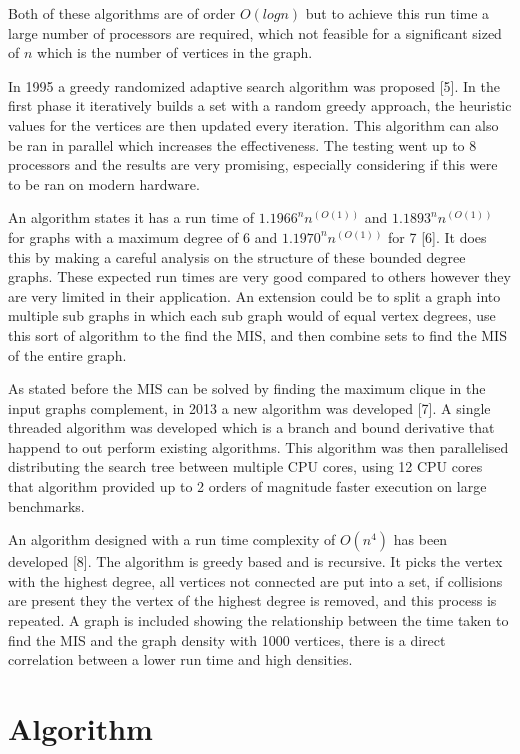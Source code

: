 \documentclass[conference]{IEEEtran}
\begin{document}
Both of these algorithms are of order $O(logn)$ but to achieve this run time a large number of processors are required,
which not feasible for a significant sized of $n$ which is the number of vertices in the graph.

In 1995 a greedy randomized adaptive search algorithm was proposed [5]. In the first phase it iteratively builds a set 
with a random greedy approach, the heuristic values for the vertices are then updated every iteration. This algorithm
can also be ran in parallel which increases the effectiveness. The testing went up to 8 processors and the results are
very promising, especially considering if this were to be ran on modern hardware.

An algorithm states it has a run time of $1.1966^n n^(O(1))$ and $1.1893^n n^(O(1))$ for graphs with a maximum degree
of 6 and $1.1970^n n^(O(1))$ for 7 [6]. It does this by making a careful analysis on the structure of these bounded degree
graphs. These expected run times are very good compared to others however they are very limited in their application.
An extension could be to split a graph into multiple sub graphs in which each sub graph would of equal vertex degrees,
use this sort of algorithm to the find the MIS, and then combine sets to find the MIS of the entire graph.

As stated before the MIS can be solved by finding the maximum clique in the input graphs complement, in 2013 a new 
algorithm was developed [7]. A single threaded algorithm was developed which is a branch and bound derivative that 
happend to out perform existing algorithms. This algorithm was then parallelised distributing the search tree between
multiple CPU cores, using 12 CPU cores that algorithm provided up to 2 orders of magnitude faster execution on large
benchmarks.

An algorithm designed with a run time complexity of $O(n^4)$ has been developed [8]. The algorithm is greedy based and 
is recursive. It picks the vertex with the highest degree, all vertices not connected are put into a set, if collisions
are present they the vertex of the highest degree is removed, and this process is repeated. A graph is included showing
the relationship between the time taken to find the MIS and the graph density with 1000 vertices, there is a direct 
correlation between a lower run time and high densities.


\section{Algorithm}
\end{document}
